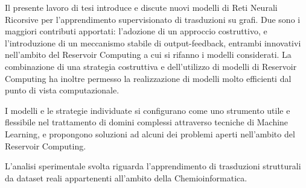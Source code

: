 Il presente lavoro di tesi introduce e discute nuovi modelli di Reti Neurali Ricorsive per l'apprendimento supervisionato di trasduzioni su grafi. Due sono i maggiori contributi apportati: l'adozione di un approccio costruttivo, e l'introduzione di un meccanismo stabile di output-feedback, entrambi innovativi nell'ambito del Reservoir Computing a cui si rifanno i modelli considerati. La combinazione di una strategia costruttiva e dell'utilizzo di modelli di Reservoir Computing ha inoltre permesso la realizzazione di modelli molto efficienti dal punto di vista computazionale.

I modelli e le strategie individuate si configurano come uno strumento utile e flessibile nel trattamento di domini complessi attraverso tecniche di Machine Learning, e propongono soluzioni ad alcuni dei problemi aperti nell'ambito del Reservoir Computing.

L'analisi sperimentale svolta riguarda l'apprendimento di trasduzioni strutturali da dataset reali appartenenti all'ambito della Chemioinformatica.



\begin{comment}
\small
Il Machine Learning si propone di ampliare la classe dei problemi trattabili laddove non risultino applicabili approcci algoritmici o analitici. Rilevante è dunque in questo ambito il trattamento di domini strutturati: poiché in numerosi campi le relazioni tra i dati possono essere rappresentate sotto forma di grafi, estendere la gamma di strategie utili ad apprendere trasduzioni strutturali può infatti dare risposta a problemi esistenti e permettere lo sviluppo di nuove applicazioni.

Nel contesto del Machine Learning, il trattamento di domini strutturati attraverso il paradigma neurale trova principalmente due ostacoli: l'alto costo computazionale e la presenza di vincoli sulla classe degli input trattabili. Il Reservoir Computing propone soluzioni ad entrambi i problemi, offrendo modelli efficienti in grado di apprendere trasduzioni strutturali definite su grafi generici. 

Nel corso della tesi vengono introdotti nuovi modelli di Reti Neurali Ricorsive, nell'ambito del Reservoir Computing, per l'apprendimento supervisionato di trasduzioni su grafi. I modelli proposti si caratterizzano per l'adozione di un approccio costruttivo, innovativo nell'ambito del Reservoir Computing, che permette di individuare soluzioni ad alcuni dei problemi che caratterizzano i modelli esistenti. I modelli proposti permettono infatti la determinazione della topologia della rete attraverso un processo adattivo e la realizzazione di un meccanismo stabile di output-feedback per introdurre informazione supervisionata all'interno del processo di encoding del reservoir. La strategia costruttiva permette inoltre la realizzazione di modelli molto efficienti dal punto di vista computazionale.

L'analisi sperimentale svolta riguarda l'apprendimento di trasduzioni strutturali da dataset reali appartenenti all'ambito della Chemioinformatica.
\end{comment}